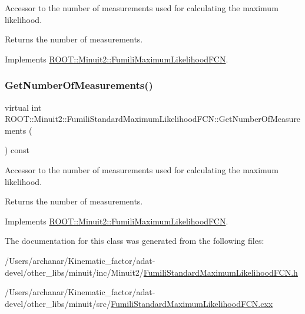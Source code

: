 Accessor to the number of measurements used for calculating the maximum likelihood.

\begin{DoxyReturn}{Returns}
the number of measurements. 
\end{DoxyReturn}


Implements \mbox{\hyperlink{classROOT_1_1Minuit2_1_1FumiliMaximumLikelihoodFCN_af0a6b5a302f978363074039c7d55d529}{R\+O\+O\+T\+::\+Minuit2\+::\+Fumili\+Maximum\+Likelihood\+F\+CN}}.

\mbox{\label{classROOT_1_1Minuit2_1_1FumiliStandardMaximumLikelihoodFCN_a7c1f879db750fb33c206d3edbbd19ae0}} 
\subsubsection{\texorpdfstring{GetNumberOfMeasurements()}{GetNumberOfMeasurements()}\hspace{0.1cm}{\footnotesize\ttfamily [3/3]}}
{\footnotesize\ttfamily virtual int R\+O\+O\+T\+::\+Minuit2\+::\+Fumili\+Standard\+Maximum\+Likelihood\+F\+C\+N\+::\+Get\+Number\+Of\+Measurements (\begin{DoxyParamCaption}{ }\end{DoxyParamCaption}) const\hspace{0.3cm}{\ttfamily [virtual]}}

Accessor to the number of measurements used for calculating the maximum likelihood.

\begin{DoxyReturn}{Returns}
the number of measurements. 
\end{DoxyReturn}


Implements \mbox{\hyperlink{classROOT_1_1Minuit2_1_1FumiliMaximumLikelihoodFCN_af0a6b5a302f978363074039c7d55d529}{R\+O\+O\+T\+::\+Minuit2\+::\+Fumili\+Maximum\+Likelihood\+F\+CN}}.



The documentation for this class was generated from the following files\+:\begin{DoxyCompactItemize}
\item 
/\+Users/archanar/\+Kinematic\+\_\+factor/adat-\/devel/other\+\_\+libs/minuit/inc/\+Minuit2/\mbox{\hyperlink{adat-devel_2other__libs_2minuit_2inc_2Minuit2_2FumiliStandardMaximumLikelihoodFCN_8h}{Fumili\+Standard\+Maximum\+Likelihood\+F\+C\+N.\+h}}\item 
/\+Users/archanar/\+Kinematic\+\_\+factor/adat-\/devel/other\+\_\+libs/minuit/src/\mbox{\hyperlink{adat-devel_2other__libs_2minuit_2src_2FumiliStandardMaximumLikelihoodFCN_8cxx}{Fumili\+Standard\+Maximum\+Likelihood\+F\+C\+N.\+cxx}}\end{DoxyCompactItemize}
